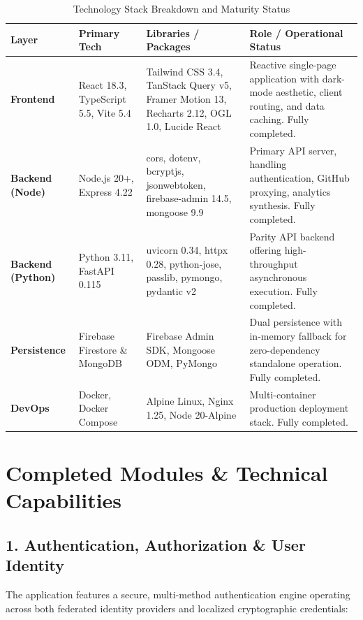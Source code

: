 \documentclass[11pt,a4paper]{article}
\begin{document}
\begin{table}[htbp]
\centering
\small
\begin{tabularx}{\textwidth}{l p{3.2cm} p{4.2cm} X}
\toprule
\textbf{Layer} & \textbf{Primary Tech} & \textbf{Libraries / Packages} & \textbf{Role / Operational Status} \\
\midrule
\textbf{Frontend} & React 18.3, TypeScript 5.5, Vite 5.4 & Tailwind CSS 3.4, TanStack Query v5, Framer Motion 13, Recharts 2.12, OGL 1.0, Lucide React & Reactive single-page application with dark-mode aesthetic, client routing, and data caching. Fully completed. \\
\addlinespace
\textbf{Backend (Node)} & Node.js 20+, Express 4.22 & cors, dotenv, bcryptjs, jsonwebtoken, firebase-admin 14.5, mongoose 9.9 & Primary API server, handling authentication, GitHub proxying, analytics synthesis. Fully completed. \\
\addlinespace
\textbf{Backend (Python)} & Python 3.11, FastAPI 0.115 & uvicorn 0.34, httpx 0.28, python-jose, passlib, pymongo, pydantic v2 & Parity API backend offering high-throughput asynchronous execution. Fully completed. \\
\addlinespace
\textbf{Persistence} & Firebase Firestore \& MongoDB & Firebase Admin SDK, Mongoose ODM, PyMongo & Dual persistence with in-memory fallback for zero-dependency standalone operation. Fully completed. \\
\addlinespace
\textbf{DevOps} & Docker, Docker Compose & Alpine Linux, Nginx 1.25, Node 20-Alpine & Multi-container production deployment stack. Fully completed. \\
\bottomrule
\end{tabularx}
\caption{Technology Stack Breakdown and Maturity Status}
\end{table}

\section{Completed Modules \& Technical Capabilities}

\subsection{1. Authentication, Authorization \& User Identity}
The application features a secure, multi-method authentication engine operating across both federated identity providers and localized cryptographic credentials:
\end{document}
